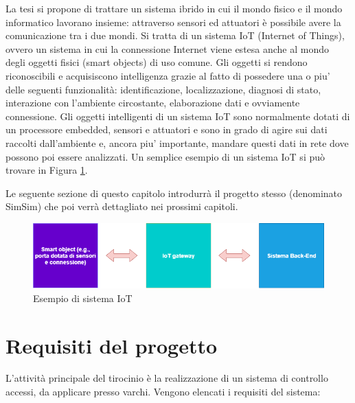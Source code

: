 \documentclass[12pt]{report}
\begin{document}
La tesi si propone di trattare un sistema ibrido in cui il mondo fisico e il mondo informatico lavorano insieme: attraverso sensori ed attuatori è possibile avere la comunicazione tra i due mondi. 
Si tratta di un sistema IoT (Internet of Things), ovvero un sistema in cui la connessione Internet viene estesa anche al mondo degli oggetti fisici (smart objects\cite{smart_objects}) di uso comune. Gli oggetti si rendono riconoscibili e acquisiscono intelligenza grazie al fatto di possedere una o piu' delle seguenti funzionalità: identificazione, localizzazione, diagnosi di stato, interazione con l'ambiente circostante, elaborazione dati e ovviamente connessione.
Gli oggetti intelligenti di un sistema IoT sono normalmente dotati di un processore embedded, sensori e attuatori e sono in grado di agire sui dati raccolti dall'ambiente e, ancora piu' importante, mandare questi dati in rete dove possono poi essere analizzati\cite{IoT}. Un semplice esempio di un sistema IoT si può trovare in Figura \ref{fig:iot_diagram}.

Le seguente sezione di questo capitolo introdurrà il progetto stesso (denominato SimSim) che poi verrà dettagliato nei prossimi capitoli.

\begin{figure}
	\includegraphics[width=\linewidth]{./img/iot_diagram.png}
	\caption{Esempio di sistema IoT}
	\label{fig:iot_diagram}
\end{figure}


%
\section{Requisiti del progetto}
%

L'attività principale del tirocinio è la realizzazione di un sistema di controllo accessi, da applicare presso varchi. Vengono elencati i requisiti del sistema:
\end{document}
